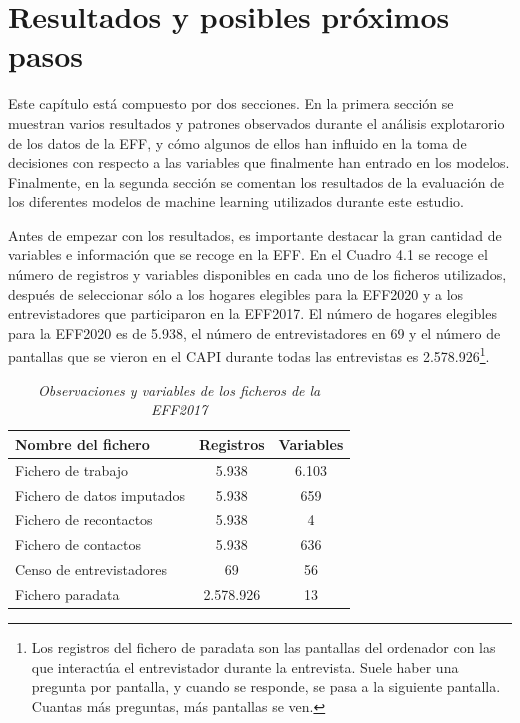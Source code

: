 \chapter{Resultados y posibles próximos pasos}
\label{chapter:resultados}

Este capítulo está compuesto por dos secciones. En la primera sección se muestran varios resultados y patrones observados durante el análisis explotarorio de los datos de la EFF, y cómo algunos de ellos han influido en la toma de decisiones con respecto a las variables que finalmente han entrado en los modelos. Finalmente, en la segunda sección se comentan los resultados de la evaluación de los diferentes modelos de machine learning utilizados durante este estudio.

Antes de empezar con los resultados, es importante destacar la gran cantidad de variables e información que se recoge en la EFF. En el Cuadro 4.1 se recoge el número de registros y variables disponibles en cada uno de los ficheros utilizados, después de seleccionar sólo a los hogares elegibles para la EFF2020 y a los entrevistadores que participaron en la EFF2017. El número de hogares elegibles para la EFF2020 es de 5.938, el número de entrevistadores en 69 y el número de pantallas que se vieron en el CAPI durante todas las entrevistas es 2.578.926\footnote{Los registros del fichero de paradata son las pantallas del ordenador con las que interactúa el entrevistador durante la entrevista. Suele haber una pregunta por pantalla, y cuando se responde, se pasa a la siguiente pantalla. Cuantas más preguntas, más pantallas se ven.}.

\begin{table}[h]
    \centering{}
    \begin{tabular}{ | l | c | c |}
    \hline
    Nombre del fichero & Registros & Variables \\ \hline
    Fichero de trabajo & 5.938 & 6.103 \\
    Fichero de datos imputados  & 5.938 & 659 \\
    Fichero de recontactos  & 5.938 & 4 \\
    Fichero de contactos  & 5.938 & 636 \\
    Censo de entrevistadores  & 69 & 56 \\
    Fichero paradata  & 2.578.926 & 13 \\
    \hline
    \end{tabular}
    \caption{\textit{Observaciones y variables de los ficheros de la EFF2017}}
\end{table}

